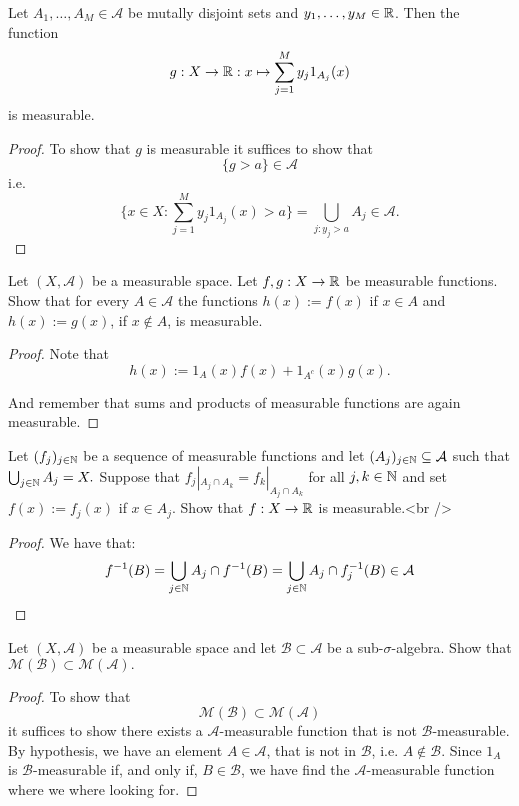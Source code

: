 \begin{prop}
Let \(A_{1},\ldots ,A_M\in \mathcal{A}\) be mutally disjoint sets and \(y_{1},\ldots ,y_M\in \Bbb{R}\). Then the function
\[
g: X\rightarrow \Bbb{R} : x\mapsto \sum _{j=1}^M y_{j}1_{A_{j}}(x)
\]
is measurable.
\end{prop}

\begin{proof}
To show that \(g\) is measurable it suffices to show that
\[
\{g>a\}\in \mathcal{A}
\]
i.e.
\[
\Big\{x\in X:\sum _{j=1}^M y_{j}1_{A_{j}}(x)>a\Big\}=\bigcup _{j:y_{j}>a}A_{j}\in \mathcal{A}.
\]
\end{proof}

\begin{thm}[Problem 8.3i]
Let \((X,\mathcal{A})\) be a measurable space. Let \(f,g : X\rightarrow \Bbb{R}\) be measurable functions. Show that for every \(A\in \mathcal{A}\) the functions \(h(x):=f(x)\) if \(x\in A\) and $h(x):=g(x)$, if \(x\not\in A\), is measurable.
\end{thm}

\begin{proof}
Note that
\[
h(x):=1_A(x)f(x)+1_{A^c}(x)g(x).
\]

And remember that sums and products of measurable functions are again measurable.
\end{proof}

\begin{thm}[Problem 8.3ii]
Let \((f_{j})_{j\in \Bbb{N}}\) be a sequence of measurable functions and let \((A_{j})_{j\in \Bbb{N}}\subseteq \mathcal{A}\) such that \(\bigcup _{j\in \Bbb{N}}A_{j}=X.\) Suppose that \(f_{j}|_{A_{j}\cap A_{k}}=f_{k}|_{A_{j}\cap A_{k}}\) for all \(j,k\in \Bbb{N}\) and set \(f(x):=f_{j}(x)\) if \(x\in A_{j}\). Show that \(f:X\rightarrow \Bbb{R}\) is measurable.<br />
\end{thm}

\begin{proof}
We have that:
\[
f^{-1}(B)=\bigcup _{j\in \Bbb{N}}A_{j}\cap f^{-1}(B)=\bigcup _{j\in \Bbb{N}}A_{j}\cap f_{j}^{-1}(B)\in \mathcal{A}
\]
\end{proof}

\begin{thm}[Problem 8.4]
Let \((X,\mathcal{A})\) be a measurable space and let \(\mathcal{B}\subset \mathcal{A}\) be a sub-\(\sigma \)-algebra. Show that \(\mathcal{M}(\mathcal{B})\subset \mathcal{M}(\mathcal{A}).\)
\end{thm}

\begin{proof}
To show that
\[
\mathcal{M}(\mathcal{B})\subset \mathcal{M}(\mathcal{A})
\]
it suffices to show there exists a \(\mathcal{A}\)-measurable function that is not \(\mathcal{B}\)-measurable. By hypothesis, we have an element \(A\in \mathcal{A}\), that is not in \(\mathcal{B}\), i.e. \(A\not\in \mathcal{B}\). Since \(1_A\) is \(\mathcal{B}\)-measurable if, and only if, \(B\in \mathcal{B}\), we have find the \(\mathcal{A}\)-measurable function where we where looking for.
\end{proof}

